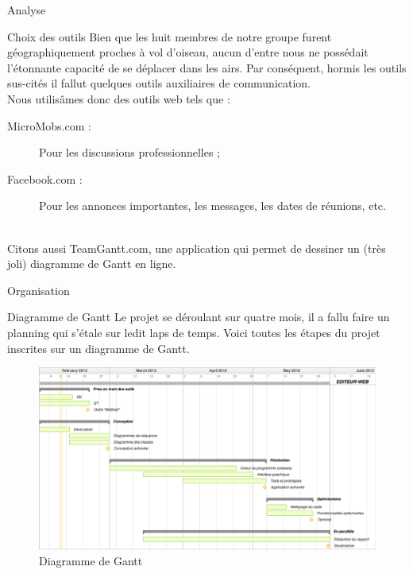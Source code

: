 \documentclass[a4paper, 12pt]{report}
\begin{document}
\begin{part}{Analyse}
\begin{chapter}{Choix des outils}
			Bien que les huit membres de notre groupe furent géographiquement proches à vol d'oiseau, aucun d'entre nous ne possédait l'étonnante
			capacité de se déplacer dans les airs. Par conséquent, hormis les outils sus-cités il fallut quelques outils auxiliaires de communication.
			\\
			Nous utilisâmes donc des outils web tels que :
			\begin{description}
				\item[MicroMobs.com :] Pour les discussions professionnelles ;
				\item[Facebook.com :] Pour les annonces importantes, les messages, les dates de réunions, etc.
			\end{description}~\\

			Citons aussi TeamGantt.com, une application qui permet de dessiner un (très joli) diagramme de Gantt en ligne.
		\end{chapter}
		\begin{chapter}{Organisation}
		\begin{section}{Diagramme de Gantt}
			Le projet se déroulant sur quatre mois, il a fallu faire un planning qui s'étale sur ledit laps de temps.
			Voici toutes les étapes du projet inscrites sur un \gls{diagramme de Gantt}.
				\begin{figure}[h]
					\begin{center}
						\includegraphics[width=17cm]{images/DiagrammeGantt.png}
						\caption{Diagramme de Gantt}
						\label{flute}
					\end{center}
				\end{figure}~\\
			\end{section}
		\end{chapter}
	\end{part}
\end{document}
